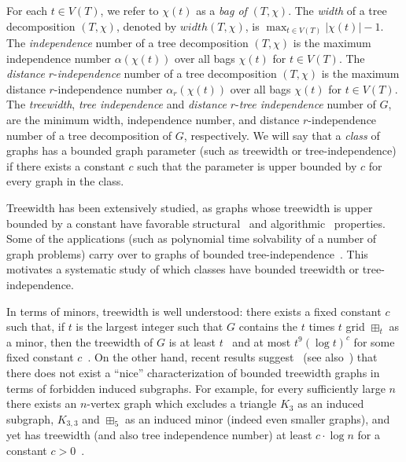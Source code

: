 For each $t\in V(T)$, we refer to $\chi(t)$ as a \textit{bag of} $(T, \chi)$.  The \emph{width} of a tree decomposition $(T, \chi)$, denoted by $width(T, \chi)$, is $\max_{t \in V(T)} |\chi(t)|-1$. 
%
The {\em independence} number of a tree decomposition $(T, \chi)$ is the maximum independence number $\alpha(\chi(t))$ over all bags $\chi(t)$ for $t \in V(T)$.
%
The {\em distance} $r$-{\em independence} number of a tree decomposition $(T, \chi)$ is the maximum distance $r$-independence number $\alpha_r(\chi(t))$ over all bags $\chi(t)$ for $t \in V(T)$.
%
The \emph{treewidth}, {\em tree independence} and {\em distance} $r$-{\em tree independence} number of $G$, are
the minimum width, independence number, and distance $r$-independence number of a tree decomposition of $G$, respectively. 
%
We will say that a {\em class} of graphs has a bounded graph parameter (such as treewidth or tree-independence) if there exists a constant $c$ such that the parameter is upper bounded by $c$ for every graph in the class. 

Treewidth has been extensively studied, as graphs whose treewidth is upper bounded by a constant have favorable structural~\cite{bodlaender1998partial, GMV} and algorithmic~\cite{cygan2015parameterized} properties. Some of the applications (such as polynomial time solvability of a number of graph problems) carry over to graphs of bounded tree-independence~\cite{dallard2024treewidth,DBLP:conf/esa/LimaMMORS24}. 
%
This motivates a systematic study of which classes have bounded treewidth or tree-independence.

In terms of minors, treewidth is well understood: there exists a fixed constant $c$ such that, if  $t$ is the largest integer such that $G$ contains the $t$ times $t$ grid $\boxplus_{t}$ as a minor, then the treewidth of $G$ is at least $t$~\cite{diestel2025graph} and at most $t^9(\log t)^c$ for some fixed constant $c$~\cite{chekuri2016polynomial,chuzhoy2021towards}. 
%
On the other hand, recent results suggest~\cite{sintiari2021theta} (see also~\cite{DBLP:journals/corr/abs-2502-14775}) that there does not exist a ``nice'' characterization of bounded treewidth graphs in terms of forbidden induced subgraphs. For example, for every sufficiently large $n$ there exists an $n$-vertex graph which excludes a triangle $K_3$ as an induced subgraph, $K_{3,3}$ and $\boxplus_{5}$ as an induced minor (indeed even smaller graphs), and yet has treewidth (and also tree independence number) at least $c \cdot \log n$ for a constant $c > 0$~\cite{sintiari2021theta}.

